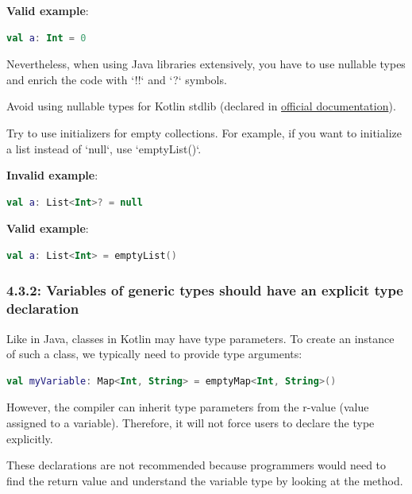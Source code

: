 {{{{\textbf{Valid example}:

\begin{lstlisting}[language=Kotlin]
val a: Int = 0
\end{lstlisting}


Nevertheless, when using Java libraries extensively, you have to use nullable types and enrich the code with `!!` and `?` symbols.

Avoid using nullable types for Kotlin stdlib (declared in \href{https://kotlinlang.org/api/latest/jvm/stdlib/kotlin.collections/}{official documentation}). 

Try to use initializers for empty collections. For example, if you want to initialize a list instead of `null`, use `emptyList()`.



\textbf{Invalid example}:

\begin{lstlisting}[language=Kotlin]
val a: List<Int>? = null 
\end{lstlisting}


\textbf{Valid example}:

\begin{lstlisting}[language=Kotlin]
val a: List<Int> = emptyList()
\end{lstlisting}


\subsubsection*{\textbf{4.3.2: Variables of generic types should have an explicit type declaration}}
\leavevmode\newline

\label{sec:4.3.2}

Like in Java, classes in Kotlin may have type parameters. To create an instance of such a class, we typically need to provide type arguments:



\begin{lstlisting}[language=Kotlin]
val myVariable: Map<Int, String> = emptyMap<Int, String>() 
\end{lstlisting}


However, the compiler can inherit type parameters from the r-value (value assigned to a variable). Therefore, it will not force users to declare the type explicitly.

These declarations are not recommended because programmers would need to find the return value and understand the variable type by looking at the method.



}}}}
